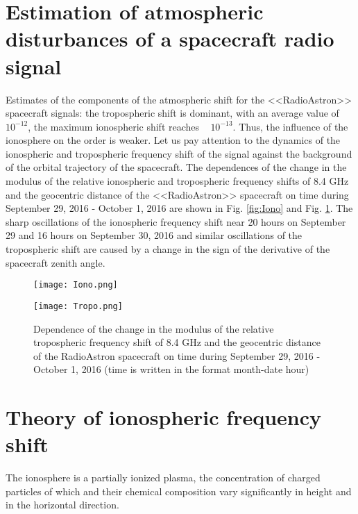 \documentclass[a4paper,english,bopenany]{article}
\begin{document}
\section{Estimation of atmospheric disturbances of a spacecraft radio signal}

Estimates of the components of the atmospheric shift for the <<RadioAstron>> spacecraft signals: the tropospheric shift is dominant, with an average value of ~ $ 10 ^ {- 12} $, the maximum ionospheric shift reaches ~ $ 10 ^ {-13 } $.
Thus, the influence of the ionosphere on the order is weaker. Let us pay attention to the dynamics of the ionospheric and tropospheric frequency shift of the signal against the background of the orbital trajectory of the spacecraft. The dependences of the change in the modulus of the relative ionospheric and tropospheric frequency shifts of 8.4 GHz and the geocentric distance of the <<RadioAstron>> spacecraft on time during September 29, 2016 - October 1, 2016 are shown in Fig. \ref{fig:Iono} and Fig. \ref{fig:Tropo}. The sharp oscillations of the ionospheric frequency shift near 20 hours on September 29 and 16 hours on September 30, 2016 and similar oscillations of the tropospheric shift are caused by a change in the sign of the derivative of the spacecraft zenith angle.

 \begin{figure}[h!]
	\centering
	\texttt{[image: Iono.png]}
	\caption{The dependence of the change in the modulus of the relative ionospheric frequency shift of 8.4 GHz and the geocentric distance of the RadioAstron spacecraft on time during September 29, 2016 - October 1, 2016 (time is written in the format month-date hour)}
	\label{fig:Iono}
	\centering
	
	\texttt{[image: Tropo.png]}
	\caption{Dependence of the change in the modulus of the relative tropospheric frequency shift of 8.4 GHz and the geocentric distance of the RadioAstron spacecraft on time during September 29, 2016 - October 1, 2016 (time is written in the format month-date hour)}
	\label{fig:Tropo}
\end{figure}


\section{Theory of ionospheric frequency shift}

The ionosphere is a partially ionized plasma, the concentration of charged particles of which and their chemical composition vary significantly in height and in the horizontal direction.
\end{document}
